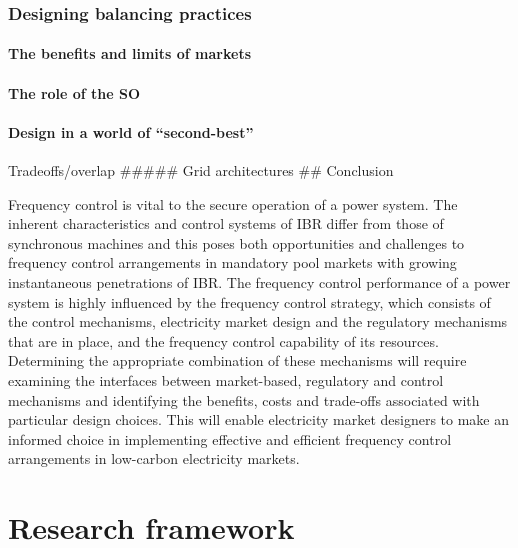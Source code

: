 \documentclass[12pt,a4paper,]{report}
\begin{document}
\hypertarget{designing-balancing-practices}{%
\subsection{Designing balancing
practices}\label{designing-balancing-practices}}

\hypertarget{the-benefits-and-limits-of-markets}{%
\subsubsection{The benefits and limits of
markets}\label{the-benefits-and-limits-of-markets}}

\hypertarget{the-role-of-the-so}{%
\subsubsection{The role of the SO}\label{the-role-of-the-so}}

\hypertarget{design-in-a-world-of-second-best}{%
\subsubsection{Design in a world of
``second-best''}\label{design-in-a-world-of-second-best}}

Tradeoffs/overlap \#\#\#\#\# Grid architectures \#\# Conclusion

Frequency control is vital to the secure operation of a power system.
The inherent characteristics and control systems of IBR differ from
those of synchronous machines and this poses both opportunities and
challenges to frequency control arrangements in mandatory pool markets
with growing instantaneous penetrations of IBR. The frequency control
performance of a power system is highly influenced by the frequency
control strategy, which consists of the control mechanisms, electricity
market design and the regulatory mechanisms that are in place, and the
frequency control capability of its resources. Determining the
appropriate combination of these mechanisms will require examining the
interfaces between market-based, regulatory and control mechanisms and
identifying the benefits, costs and trade-offs associated with
particular design choices. This will enable electricity market designers
to make an informed choice in implementing effective and efficient
frequency control arrangements in low-carbon electricity markets.

\hypertarget{sec:research_framework}{%
\chapter{Research framework}\label{sec:research_framework}}
\end{document}
